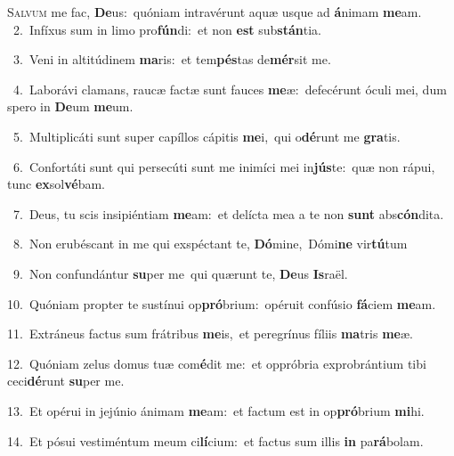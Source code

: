 \lettrine{\initial\textcolor{\initialcolor}{S}}{alvum} me fac, \textbf{De}\-us:~\star quóniam intravérunt aquæ usque ad \textbf{á}\-nimam \textbf{me}\-am.\\
{\numbfont\textcolor{\numbcolor}{~2.}}~Infíxus sum in limo pro\-\textbf{fún}\-di:~\star et non \textbf{est} sub\-\textbf{stán}\-tia.\par
{\numbfont\textcolor{\numbcolor}{~3.}}~Veni in altitúdinem \textbf{ma}\-ris:~\star et tem\-\textbf{pés}\-tas de\-\textbf{mér}\-sit me.\par
{\numbfont\textcolor{\numbcolor}{~4.}}~Laborávi clamans, raucæ factæ sunt fauces \textbf{me}\-æ:~\star defecérunt óculi mei, dum spero in \textbf{De}\-um \textbf{me}\-um.\par
{\numbfont\textcolor{\numbcolor}{~5.}}~Multiplicáti sunt super capíllos cápitis \textbf{me}\-i,~\star qui o\-\textbf{dé}\-runt me \textbf{gra}\-tis.\par
{\numbfont\textcolor{\numbcolor}{~6.}}~Confortáti sunt qui persecúti sunt me inimíci mei in\-\textbf{jús}\-te:~\star quæ non rápui, tunc \textbf{ex}\-sol\-\textbf{vé}\-bam.\par
{\numbfont\textcolor{\numbcolor}{~7.}}~Deus, tu scis insipiéntiam \textbf{me}\-am:~\star et delícta mea a te non \textbf{sunt} abs\-\textbf{cón}\-dita.\par
{\numbfont\textcolor{\numbcolor}{~8.}}~Non erubéscant in me qui exspéctant te, \textbf{Dó}\-mine,~\star Dómi\textbf{ne} vir\-\textbf{tú}\-tum\par
{\numbfont\textcolor{\numbcolor}{~9.}}~Non confundántur \textbf{su}\-per me~\star qui quærunt te, \textbf{De}\-us \textbf{Is}\-raël.\par
{\numbfont\textcolor{\numbcolor}{10.}}~Quóniam propter te sustínui op\-\textbf{pró}\-brium:~\star opéruit confúsio \textbf{fá}\-ciem \textbf{me}\-am.\par
{\numbfont\textcolor{\numbcolor}{11.}}~Extráneus factus sum frátribus \textbf{me}\-is,~\star et peregrínus fíliis \textbf{ma}\-tris \textbf{me}\-æ.\par
{\numbfont\textcolor{\numbcolor}{12.}}~Quóniam zelus domus tuæ com\-\textbf{é}\-dit me:~\star et oppróbria exprobrántium tibi ceci\-\textbf{dé}\-runt \textbf{su}\-per me.\par
{\numbfont\textcolor{\numbcolor}{13.}}~Et opérui in jejúnio ánimam \textbf{me}\-am:~\star et factum est in op\-\textbf{pró}\-brium \textbf{mi}\-hi.\par
{\numbfont\textcolor{\numbcolor}{14.}}~Et pósui vestiméntum meum ci\-\textbf{lí}\-cium:~\star et factus sum illis \textbf{in} pa\-\textbf{rá}\-bolam.\par
